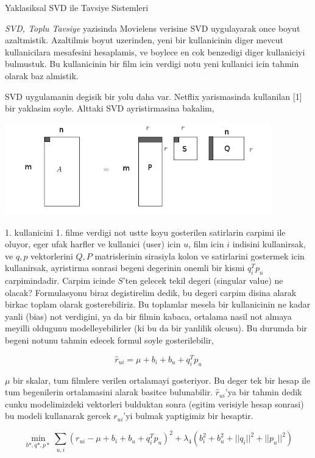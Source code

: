 \documentclass[12pt,fleqn]{article}\usepackage{../common}
\begin{document}
Yaklasiksal SVD ile Tavsiye Sistemleri

{\em SVD, Toplu Tavsiye} yazisinda Movielens verisine SVD uygulayarak once
boyut azaltmistik. Azaltilmis boyut uzerinden, yeni bir kullanicinin diger
mevcut kullanicilara mesafesini hesaplamis, ve boylece en cok benzedigi
diger kullaniciyi bulmustuk. Bu kullanicinin bir film icin verdigi notu yeni
kullanici icin tahmin olarak baz almistik. 

SVD uygulamanin degisik bir yolu daha var. Netflix yarismasinda kullanilan
[1] bir yaklasim soyle. Alttaki SVD ayristirmasina bakalim, 

\includegraphics[height=4cm]{svdapprox_1.png}

1. kullanicini 1. filme verdigi not ustte koyu gosterilen satirlarin
carpimi ile oluyor, eger ufak harfler ve kullanici (user) icin $u$, film
icin $i$ indisini kullanirsak, ve $q,p$ vektorlerini $Q,P$ matrislerinin
sirasiyla kolon ve satirlarini gostermek icin kullanirsak, ayristirma
sonrasi begeni degerinin onemli bir kismi $q_i^Tp_u$ carpimindadir. Carpim
icinde $S$'ten gelecek tekil degeri (singular value) ne olacak?
Formulasyonu biraz degistirelim dedik, bu degeri carpim disina alarak
birkac toplam olarak gosterebiliriz. Bu toplamlar mesela bir kullanicinin
ne kadar yanli (bias) not verdigini, ya da bir filmin kabaca, ortalama
nasil not almaya meyilli oldugunu modelleyebilirler (ki bu da bir yanlilik
olcusu). Bu durumda bir begeni notunu tahmin edecek formul soyle
gosterilebilir,

$$
\hat{r}_{ui} = \mu + b_i + b_u + q_i^Tp_u
$$

$\mu$ bir skalar, tum filmlere verilen ortalamayi gosteriyor. Bu deger tek
bir hesap ile tum begenilerin ortalamasini alarak basitce
bulunabilir. $\hat{r}_{ui}$'ya bir tahmin dedik cunku modelimizdeki
vektorleri bulduktan sonra (egitim verisiyle hesap sonrasi) bu modeli
kullanarak gercek $r_{ui}$'yi bulmak yaptigimiz bir hesaptir. 


$$
\min_{b*,q*,p*} \sum_{u,i} (r_{ui} - \mu + b_i + b_u + q_i^Tp_u)^2 + 
\lambda_4 (b_i^2 + b_u^2 + ||q_i||^2 + ||p_u||^2)
$$
\end{document}

